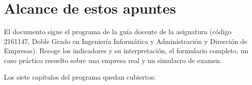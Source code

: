 \documentclass[12pt]{book} %
\begin{document}
\newpage
\thispagestyle{empty}
\mbox{}

\newpage
\thispagestyle{empty}
\mbox{}






\tableofcontents
\clearpage
\thispagestyle{empty} %

%
%

\hypertarget{alcance-de-estos-apuntes}{%
\chapter{Alcance de estos apuntes}\label{alcance-de-estos-apuntes}}

El documento sigue el programa de la guía docente de la asignatura
(código 2161147, Doble Grado en Ingeniería Informática y Administración
y Dirección de Empresas). Recoge los indicadores y su interpretación, el
formulario completo, un caso práctico resuelto sobre una empresa real y
un simulacro de examen.

Los siete capítulos del programa quedan cubiertos:
\end{document}
